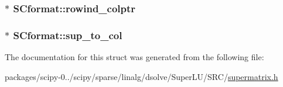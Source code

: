 \subsubsection[{rowind\+\_\+colptr}]{$\ast$ S\+Cformat\+::rowind\+\_\+colptr}\label{structSCformat_a7683b1730b067ae2058004f0f18ad88d}
\hypertarget{structSCformat_ad5cb1b2ae17c5fe554c3b70721718b08}{}
\subsubsection[{sup\+\_\+to\+\_\+col}]{$\ast$ S\+Cformat\+::sup\+\_\+to\+\_\+col}\label{structSCformat_ad5cb1b2ae17c5fe554c3b70721718b08}


The documentation for this struct was generated from the following file\+:\begin{DoxyCompactItemize}
\item 
packages/scipy-\/0../scipy/sparse/linalg/dsolve/\+Super\+L\+U/\+S\+R\+C/\hyperlink{supermatrix_8h}{supermatrix.\+h}\end{DoxyCompactItemize}
